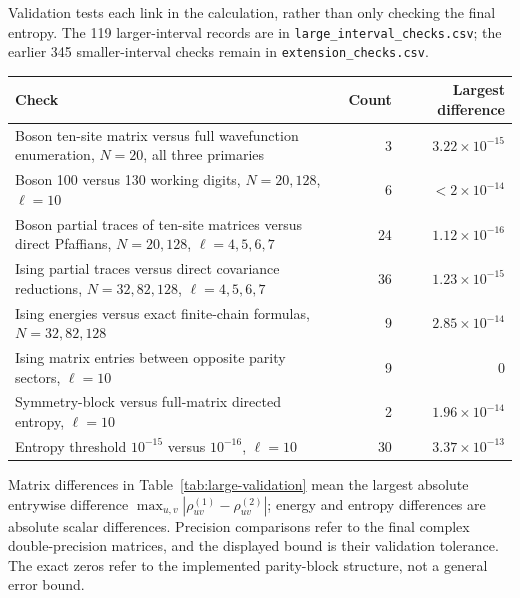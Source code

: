 Validation tests each link in the calculation, rather than only checking
the final entropy. The 119 larger-interval records are in
\texttt{large\_interval\_checks.csv}; the earlier 345 smaller-interval
checks remain in \texttt{extension\_checks.csv}.
\begin{center}
\begin{minipage}{\linewidth}\small
\captionsetup{type=table}
\begin{tabular}{p{.58\linewidth}rr}\toprule
Check & Count & Largest difference\\\midrule
Boson ten-site matrix versus full wavefunction enumeration,
$N=20$, all three primaries &3&$3.22\times10^{-15}$\\
Boson 100 versus 130 working digits, $N=20,128$, $\ell=10$
&6&$<2\times10^{-14}$\\
Boson partial traces of ten-site matrices versus direct Pfaffians,
$N=20,128$, $\ell=4,5,6,7$ &24&$1.12\times10^{-16}$\\
Ising partial traces versus direct covariance reductions,
$N=32,82,128$, $\ell=4,5,6,7$ &36&$1.23\times10^{-15}$\\
Ising energies versus exact finite-chain formulas,
$N=32,82,128$ &9&$2.85\times10^{-14}$\\
Ising matrix entries between opposite parity sectors, $\ell=10$
&9&$0$\\
Symmetry-block versus full-matrix directed entropy, $\ell=10$
&2&$1.96\times10^{-14}$\\
Entropy threshold $10^{-15}$ versus $10^{-16}$, $\ell=10$
&30&$3.37\times10^{-13}$\\\bottomrule
\end{tabular}
\caption{Large-chain contraction and entropy checks. Counts give
the number of comparisons in each test family; sizes, interval lengths
and primary-state coverage are specified in the first column. Matrix
errors are maximum absolute entrywise differences; energy and entropy
errors are absolute scalar differences. The precision row reports a
validation-tolerance bound on the final double-precision matrices.}
\label{tab:large-validation}
\end{minipage}
\end{center}
Matrix differences in Table~\ref{tab:large-validation} mean the largest absolute entrywise
difference $\max_{u,v}|\rho^{(1)}_{uv}-\rho^{(2)}_{uv}|$; energy and
entropy differences are absolute scalar differences. Precision comparisons
refer to the final complex double-precision matrices, and the displayed
bound is their validation tolerance. The exact zeros refer to the
implemented parity-block structure, not a general error bound.

